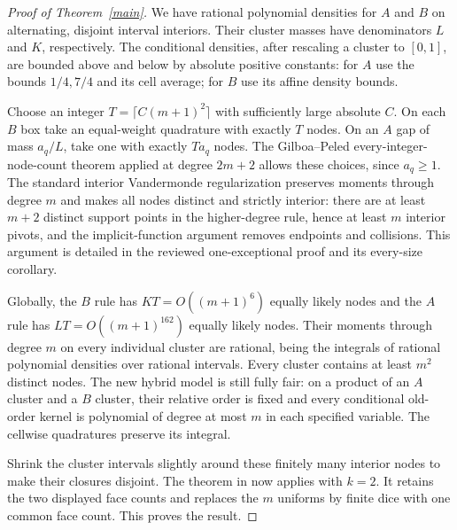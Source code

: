 \documentclass[11pt]{article}
\begin{document}
\begin{proof}[Proof of Theorem~\ref{main}]
We have rational polynomial densities for $A$ and $B$ on alternating,
disjoint interval interiors. Their cluster masses have denominators
$L$ and $K$, respectively. The conditional densities, after rescaling
a cluster to $[0,1]$, are bounded above and below by absolute positive
constants: for $A$ use the bounds $1/4,7/4$ and its cell average;
for $B$ use its affine density bounds.

Choose an integer $T=\lceil C(m+1)^2\rceil$ with sufficiently large absolute $C$.
On each $B$ box take an equal-weight quadrature with exactly $T$ nodes.
On an $A$ gap of mass $a_q/L$, take one with exactly $Ta_q$ nodes.
The Gilboa--Peled every-integer-node-count theorem applied at degree
$2m+2$ allows these choices, since $a_q\ge1$. The standard interior
Vandermonde regularization preserves moments through degree $m$ and
makes all nodes distinct and strictly interior: there are at least
$m+2$ distinct support points in the higher-degree rule, hence at least
$m$ interior pivots, and the implicit-function argument removes
endpoints and collisions. This argument is detailed in the reviewed
one-exceptional proof and its every-size corollary.

Globally, the $B$ rule has $KT=O((m+1)^6)$ equally likely nodes and the
$A$ rule has $LT=O((m+1)^{162})$ equally likely nodes. Their moments
through degree $m$ on every individual cluster are rational, being the
integrals of rational polynomial densities over rational intervals.
Every cluster contains at least $m^2$ distinct nodes. The new hybrid
model is still fully fair: on a product of an $A$ cluster and a $B$
cluster, their relative order is fixed and every conditional old-order
kernel is polynomial of degree at most $m$ in each specified variable.
The cellwise quadratures preserve its integral.

Shrink the cluster intervals slightly around these finitely many
interior nodes to make their closures disjoint. The theorem in
 now applies with $k=2$.
It retains the two displayed face counts and replaces the $m$ uniforms
by finite dice with one common face count. This proves the result.
\end{proof}
\end{document}
